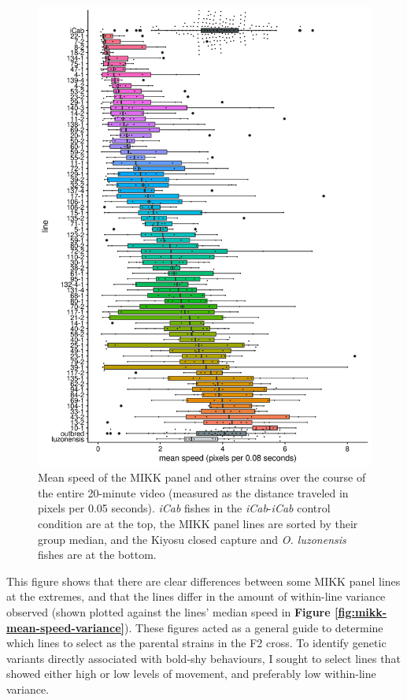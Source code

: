 \documentclass[
]{book}
\begin{document}
\begin{figure}
\includegraphics[width=1\linewidth]{figs/mikk_behaviour/F0_line_mean_speed_0.08} \caption{Mean speed of the MIKK panel and other strains over the course of the entire 20-minute video (measured as the distance traveled in pixels per 0.05 seconds). \emph{\textcolor{iCab_424B4D}{iCab}} fishes in the \emph{\textcolor{iCab_424B4D}{iCab}}-\emph{\textcolor{iCab_424B4D}{iCab}} control condition are at the top, the MIKK panel lines are sorted by their group median, and the Kiyosu closed capture and \emph{O. luzonensis} fishes are at the bottom.}\label{fig:mikk-mean-speed}
\end{figure}

This figure shows that there are clear differences between some MIKK panel lines at the extremes, and that the lines differ in the amount of within-line variance observed (shown plotted against the lines' median speed in \textbf{Figure \ref{fig:mikk-mean-speed-variance}}). These figures acted as a general guide to determine which lines to select as the parental strains in the F2 cross. To identify genetic variants directly associated with bold-shy behaviours, I sought to select lines that showed either high or low levels of movement, and preferably low within-line variance.
\end{document}
